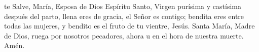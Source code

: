 te Salve, María, Esposa de Dios Espíritu Santo, Virgen purísima y castísima después del parto, llena eres de gracia, 
el Señor es contigo; bendita eres entre todas las mujeres, y bendito es el fruto de tu vientre, Jesús. Santa María, Madre de Dios, 
ruega por nosotros pecadores, ahora u en el hora de nuestra muerte. Amén.